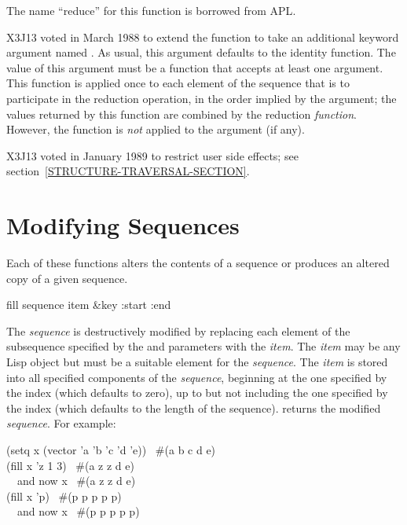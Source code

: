 \begin{defun}[Function]
The name ``reduce'' for this function is borrowed from {APL}.

\begin{new}
X3J13 voted in March 1988 
to extend the  function to take
an additional keyword argument named .  As usual, this argument
defaults to the identity function.  The value of this argument must be
a function that accepts at least one argument.  This function is applied once
to each element of the
sequence that is to participate in the reduction operation, in the order
implied by the  argument; the values returned by this
function are combined by the reduction \emph{function}.
However, the  function is \emph{not} applied
to the  argument (if any).
\end{new}

\begin{new}
X3J13 voted in January 1989
to restrict user side effects; see section~\ref{STRUCTURE-TRAVERSAL-SECTION}.
\end{new}
\end{defun}

\section{Modifying Sequences}

Each of these functions alters the contents of a sequence or produces
an altered copy of a given sequence.

\begin{defun}[Function]
fill sequence item &key :start :end

The \emph{sequence} is destructively modified by replacing each element of
the subsequence specified by the  and  parameters
with the \emph{item}.  The \emph{item} may be any Lisp object but must be a
suitable element for the \emph{sequence}.  The \emph{item} is stored into all
specified components of the \emph{sequence}, beginning at the one specified
by the  index (which defaults to zero), up to but not
including the one specified by the  index (which defaults to the
length of the sequence).   returns the modified \emph{sequence}.
For example:
\begin{lisp}
(setq x (vector 'a 'b 'c 'd 'e)) \EV\ \#(a b c d e) \\
(fill x 'z  1  3) \EV\ \#(a z z d e) \\
~~\textrm{and now} x \EV\ \#(a z z d e) \\
(fill x 'p) \EV\ \#(p p p p p) \\
~~\textrm{and now} x \EV\ \#(p p p p p)
\end{lisp}
\end{defun}

